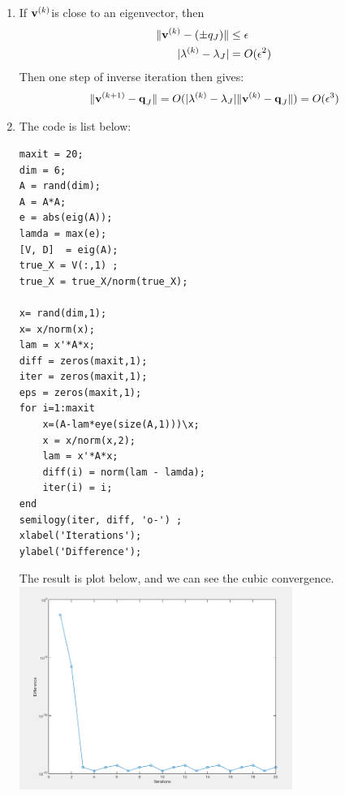 \documentclass{article}
\begin{document}
\begin{enumerate}
\item  
If $\boldsymbol{\mathrm{v}}^{(k)} $is close to an eigenvector, then \\
\begin{align*} 
\|\boldsymbol{\mathrm{v}}^{(k)}-(\pm q_J)\| &\leq \epsilon \\
|\lambda^{(k)}-\lambda_J | &=O(\epsilon^2)
\end{align*}
Then one step of inverse iteration then gives: \\
\begin{align*} 
\|\boldsymbol{\mathrm{v}}^{(k+1)}-\boldsymbol{\mathrm{q}}_{J}\| = O(|\lambda^{(k)}-\lambda_J |\|\boldsymbol{\mathrm{v}}^{(k)}-\boldsymbol{\mathrm{q}}_{J}\|) = O(\epsilon^3)
\end{align*}

\item 
The code is list below: \\ 
\begin{verbatim} 
maxit = 20; 
dim = 6; 
A = rand(dim); 
A = A*A; 
e = abs(eig(A)); 
lamda = max(e); 
[V, D]  = eig(A); 
true_X = V(:,1) ; 
true_X = true_X/norm(true_X); 

x= rand(dim,1);
x= x/norm(x); 
lam = x'*A*x; 
diff = zeros(maxit,1); 
iter = zeros(maxit,1); 
eps = zeros(maxit,1); 
for i=1:maxit
    x=(A-lam*eye(size(A,1)))\x; 
    x = x/norm(x,2); 
    lam = x'*A*x; 
    diff(i) = norm(lam - lamda);  
    iter(i) = i; 
end
semilogy(iter, diff, 'o-') ; 
xlabel('Iterations'); 
ylabel('Difference'); 
\end{verbatim}
The result is plot below, and we can see the cubic convergence. \\
\includegraphics[width=0.7\textwidth]{problem2_4} 
\centering 

\end{enumerate} 


\hypertarget{}{}
\end{document}
